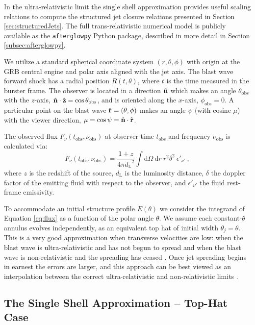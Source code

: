 \documentclass[twocolumn]{aastex62}
\newcommand{\afterglowpy}{{\tt afterglowpy}}
\newcommand{\dd}{\ensuremath{\mathrm{d}}}
\newcommand{\tobs}{\ensuremath{t_{\mathrm{obs}}}}
\newcommand{\nuobs}{\ensuremath{\nu_{\mathrm{obs}}}}
\newcommand{\thobs}{\ensuremath{\theta_{\mathrm{obs}}}}
\newcommand{\phobs}{\ensuremath{\phi_{\mathrm{obs}}}}
\newcommand{\dL}{\ensuremath{d_{\mathrm{L}}}}
\begin{document}
In the ultra-relativistic limit the single shell approximation provides useful scaling relations to compute the structured jet closure relations presented in Section \ref{sec:structuredJets}.  The full trans-relativistic numerical model is publicly available as the \afterglowpy{} Python package, described in more detail in Section \ref{subsec:afterglowpy}.

We utilize a standard spherical coordinate system $(r, \theta, \phi)$ with origin at the GRB central engine and polar axis aligned with the jet axis.  The blast wave forward shock has a radial position $R(t, \theta)$, where $t$ is the time measured in the burster frame. The observer is located in a direction $\hat{\bf n}$ which makes an angle $\thobs$ with the $z$-axis, $\hat{\bf n} \cdot \hat{\bf z} = \cos \thobs$, and is oriented along the $x$-axis, $\phobs = 0$.  A particular point on the blast wave $\hat{\bf r} = (\theta, \phi)$ makes an angle $\psi$ (with cosine $\mu$) with the viewer direction, $\mu = \cos \psi = \hat{\bf n} \cdot \hat{\bf r}$.

The observed flux $F_\nu(\tobs, \nuobs)$ at observer time $\tobs$ and frequency $\nuobs$ is calculated via:
\begin{equation}
	F_\nu(\tobs, \nuobs) = \frac{1+z}{4\pi \dL^2} \int \! \dd \Omega\  \dd r\ r^2 \delta^2\ \epsilon'_{\nu'} \ , \label{eq:flux}
\end{equation}
where $z$ is the redshift of the source, $\dL$ is the luminosity distance, $\delta$ the doppler factor of the emitting fluid with respect to the observer, and $\epsilon'_{\nu'}$ the fluid rest-frame emissivity.

To accommodate an initial structure profile $E(\theta)$ we consider the integrand of Equation \eqref{eq:flux} as a function of the polar angle $\theta$.  We assume each constant-$\theta$ annulus evolves independently, as an equivalent top hat of initial width $\theta_j = \theta$.  This is a very good approximation when transverse velocities are low: when the blast wave is ultra-relativistic and has not begun to spread and when the blast wave is non-relativistic and the spreading has ceased \citep{van-Eerten:2010aa}.  Once jet spreading begins in earnest the errors are larger, and this approach can be best viewed as an interpolation between the correct ultra-relativistic and non-relativistic limits \citep{van-Eerten:2010aa}.
{\bf 
\subsection{The Single Shell Approximation -- Top-Hat Case}\label{subsec:algo}
}
 
\end{document}
